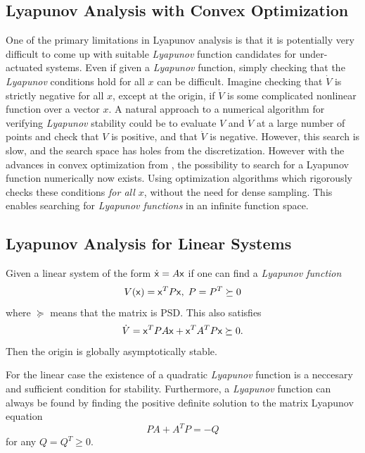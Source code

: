 \subsection{Lyapunov Analysis with Convex Optimization}
\label{subsec:Lyapunov analysis with convex optimization}

One of the primary limitations in Lyapunov analysis is that it is potentially
very difficult to come up with suitable \textit{Lyapunov} function candidates
for under-actuated systems. Even if given a \textit{Lyapunov} function, simply
checking that the \textit{Lyapunov} conditions hold for all \(x\) can be
difficult. Imagine checking that \(\dot{V}\) is strictly negative for all \(x\),
except at the origin, if \(\dot{V}\) is some complicated nonlinear function over
a vector \(x\). A natural approach to a numerical algorithm for verifying
\textit{Lyapunov} stability could be to evaluate \(V\) and \(\dot{V}\) at a
large number of points and check that \(V\) is positive, and that \(\dot{V}\) is
negative. However, this search is slow, and the search space has holes from the
discretization. However with the advances in convex optimization from
\cite{parilloStructuredSemidefinitePrograms}, the possibility to search for a
Lyapunov function numerically now exists. Using optimization algorithms which
rigorously checks these conditions \textit{for all \(x\)}, without the need for
dense sampling. This enables searching for \textit{Lyapunov functions} in an
infinite function space.

\subsection{Lyapunov Analysis for Linear Systems}
\label{subsec:Lyapunov analysis for linear systems}

\begin{theorem}
  Given a linear system of the form \(\dot{{\mathbf{\mathsf{x}}}} = A{\mathbf{\mathsf{x}}}\) if one can
  find a \textit{Lyapunov function}
  \[
    V({\mathbf{\mathsf{x}}}) = {\mathbf{\mathsf{x}}}^{T}P{\mathbf{\mathsf{x}}}, \; P = P^{T} \succeq 0
  \]
  where \(\succeq\) means that the matrix is \ac{PSD}. This also satisfies
  \[
    \dot{V} = {\mathbf{\mathsf{x}}}^{T}PA{\mathbf{\mathsf{x}}} + {\mathbf{\mathsf{x}}}^{T}A^{T}P{\mathbf{\mathsf{x}}} \succeq 0.
  \]
  Then the origin is globally asymptotically stable.
\end{theorem}

For the linear case the existence of a quadratic \textit{Lyapunov} function is a
neccesary and sufficient condition for stability. Furthermore, a
\textit{Lyapunov} function can always be found by finding the positive definite
solution to the matrix Lyapunov equation
\begin{equation}
  \label{eqn:linearlyapunov}
  PA + A^{T}P = -Q
\end{equation}
for any \(Q = Q^{T} \geqslant 0\).

